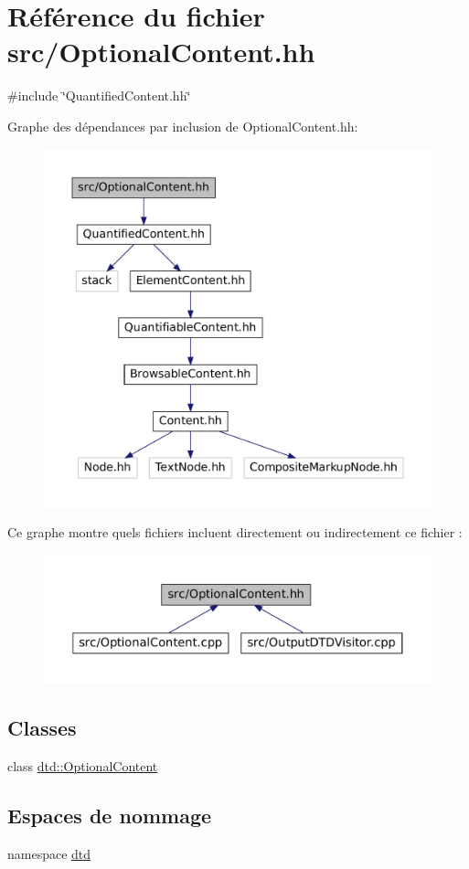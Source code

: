\hypertarget{_optional_content_8hh}{
\section{Référence du fichier src/OptionalContent.hh}
\label{_optional_content_8hh}
}
{\ttfamily \#include \char`\"{}QuantifiedContent.hh\char`\"{}}\par
Graphe des dépendances par inclusion de OptionalContent.hh:\nopagebreak
\begin{figure}[H]
\begin{center}
\leavevmode
\includegraphics[width=400pt]{_optional_content_8hh__incl}
\end{center}
\end{figure}
Ce graphe montre quels fichiers incluent directement ou indirectement ce fichier :\nopagebreak
\begin{figure}[H]
\begin{center}
\leavevmode
\includegraphics[width=400pt]{_optional_content_8hh__dep__incl}
\end{center}
\end{figure}
\subsection*{Classes}
\begin{DoxyCompactItemize}
\item 
class \hyperlink{classdtd_1_1_optional_content}{dtd::OptionalContent}
\end{DoxyCompactItemize}
\subsection*{Espaces de nommage}
\begin{DoxyCompactItemize}
\item 
namespace \hyperlink{namespacedtd}{dtd}
\end{DoxyCompactItemize}

